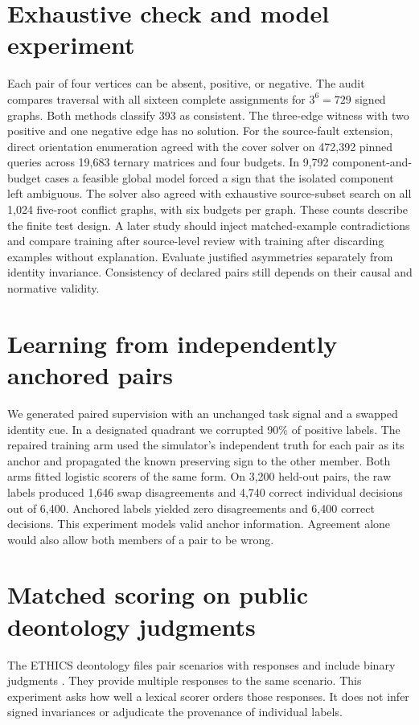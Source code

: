 \documentclass[11pt]{article}
\begin{document}
\section{Exhaustive check and model experiment}
Each pair of four vertices can be absent, positive, or negative.
The audit compares traversal with all sixteen complete assignments
for $3^6=729$ signed graphs. Both methods classify 393 as
consistent. The three-edge witness with two positive and one
negative edge has no solution. For the source-fault extension,
direct orientation enumeration agreed with the cover solver on
472,392 pinned queries across 19,683 ternary matrices and four
budgets. In 9,792 component-and-budget cases a feasible global
model forced a sign that the isolated component left ambiguous.
The solver also agreed with exhaustive source-subset search on
all 1,024 five-root conflict graphs, with six budgets per graph.
These counts describe the finite test design. A later study should
inject matched-example contradictions and compare training after
source-level review with training after discarding examples
without explanation. Evaluate justified asymmetries separately from
identity invariance. Consistency of declared pairs still depends on
their causal and normative validity.
\section{Learning from independently anchored pairs}
We generated paired supervision with an unchanged task signal and
a swapped identity cue. In a designated quadrant we corrupted
90\% of positive labels. The repaired training arm used the
simulator's independent truth for each pair as its anchor and
propagated the known preserving sign to the other member.
Both arms fitted logistic scorers of the same form. On 3,200
held-out pairs, the raw labels produced 1,646 swap disagreements
and 4,740 correct individual decisions out of 6,400. Anchored
labels yielded zero disagreements and 6,400 correct decisions.
This experiment models valid anchor information. Agreement
alone would also allow both members of a pair to be wrong.

\section{Matched scoring on public deontology judgments}
The ETHICS deontology files pair scenarios with responses
and include binary judgments \cite{hendrycks}. They provide
multiple responses to the same scenario. This experiment
asks how well a lexical scorer orders those responses.
It does not infer signed invariances or adjudicate the
provenance of individual labels.
\end{document}

